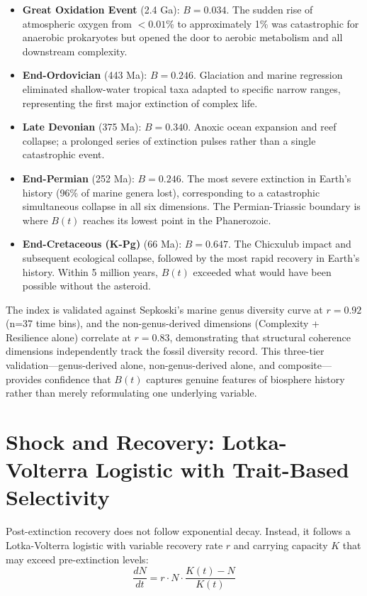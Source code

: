 \begin{itemize}
\item \textbf{Great Oxidation Event} (2.4 Ga): $B = 0.034$. The sudden rise of atmospheric oxygen from $<0.01\%$ to approximately 1\% was catastrophic for anaerobic prokaryotes but opened the door to aerobic metabolism and all downstream complexity.
\item \textbf{End-Ordovician} (443 Ma): $B = 0.246$. Glaciation and marine regression eliminated shallow-water tropical taxa adapted to specific narrow ranges, representing the first major extinction of complex life.
\item \textbf{Late Devonian} (375 Ma): $B = 0.340$. Anoxic ocean expansion and reef collapse; a prolonged series of extinction pulses rather than a single catastrophic event.
\item \textbf{End-Permian} (252 Ma): $B = 0.246$. The most severe extinction in Earth's history (96\% of marine genera lost), corresponding to a catastrophic simultaneous collapse in all six dimensions. The Permian-Triassic boundary is where $B(t)$ reaches its lowest point in the Phanerozoic.
\item \textbf{End-Cretaceous (K-Pg)} (66 Ma): $B = 0.647$. The Chicxulub impact and subsequent ecological collapse, followed by the most rapid recovery in Earth's history. Within 5 million years, $B(t)$ exceeded what would have been possible without the asteroid.
\end{itemize}

The index is validated against Sepkoski's marine genus diversity curve at $r = 0.92$ (n=37 time bins), and the non-genus-derived dimensions (Complexity + Resilience alone) correlate at $r = 0.83$, demonstrating that structural coherence dimensions independently track the fossil diversity record. This three-tier validation---genus-derived alone, non-genus-derived alone, and composite---provides confidence that $B(t)$ captures genuine features of biosphere history rather than merely reformulating one underlying variable.

\section{Shock and Recovery: Lotka-Volterra Logistic with Trait-Based Selectivity}

Post-extinction recovery does not follow exponential decay. Instead, it follows a Lotka-Volterra logistic with variable recovery rate $r$ and carrying capacity $K$ that may exceed pre-extinction levels:
\begin{equation}
\frac{dN}{dt} = r \cdot N \cdot \frac{K(t) - N}{K(t)}
\end{equation}


